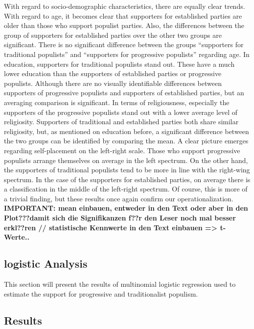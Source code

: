 \documentclass[]{article}
\begin{document}
With regard to socio-demographic characteristics, there are equally
clear trends. With regard to age, it becomes clear that supporters for
established parties are older than those who support populist parties.
Also, the differences between the group of supporters for established
parties over the other two groups are significant. There is no
significant difference between the groups ``supporters for traditional
populists'' and ``supporters for progressive populists'' regarding age.
In education, supporters for traditional populists stand out. These have
a much lower education than the supporters of established parties or
progressive populists. Although there are no visually identifiable
differences between supporters of progressive populists and supporters
of established parties, but an averaging comparison is significant. In
terms of religiousness, especially the supporters of the progressive
populists stand out with a lower average level of religiosity.
Supporters of traditional and established parties both share similar
religiosity, but, as mentioned on education before, a significant
difference between the two groups can be identified by comparing the
mean. A clear picture emerges regarding self-placement on the left-right
scale. Those who support progressive populists arrange themselves on
average in the left spectrum. On the other hand, the supporters of
traditional populists tend to be more in line with the right-wing
spectrum. In the case of the supporters for established parties, on
average there is a classification in the middle of the left-right
spectrum. Of course, this is more of a trivial finding, but these
results once again confirm our operationalization. \textbf{IMPORTANT:
mean einbauen, entweder in den Text oder aber in den Plot???damit sich
die Signifikanzen f??r den Leser noch mal besser erkl??ren //
statistische Kennwerte in den Text einbauen =\textgreater{} t-Werte..}

\subsection{logistic Analysis}\label{logistic-analysis}

This section will present the results of multinomial logistic regression
used to estimate the support for progressive and traditionalist
populism.

\subsection{Results}\label{results}
\end{document}
